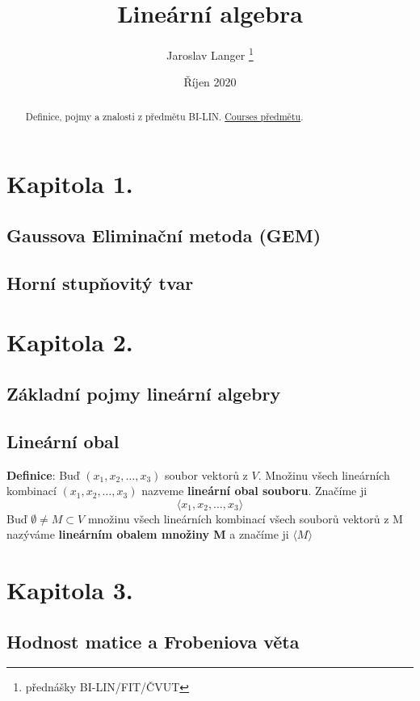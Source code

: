 \documentclass[12pt, letterpaper, twoside]{article}
\title{Lineární algebra}
\author{Jaroslav Langer \thanks{přednášky BI-LIN/FIT/ČVUT}}
\date{Říjen 2020}
\begin{document}
\maketitle

\tableofcontents

\begin{abstract}
Definice, pojmy a znalosti z předmětu BI-LIN. \href{https://courses.fit.cvut.cz/BI-LIN/}{Courses předmětu}.
\end{abstract}

\section{Kapitola 1.}

\subsection*{Gaussova Eliminační metoda (GEM)}

\subsection*{Horní stupňovitý tvar}

\section{Kapitola 2.}
\subsection*{Základní pojmy lineární algebry}

\subsection{Lineární obal}
\textbf{Definice}: Buď $(x_{1},x_{2},\dots, x_{3})$ soubor vektorů z $V$. 
Množinu všech lineárních kombinací $(x_{1},x_{2},\dots, x_{3})$ nazveme \textbf{lineární obal souboru}.
Značíme ji
\[
    \langle x_{1},x_{2},\dots, x_{3} \rangle
\]
Buď $\emptyset \neq M \subset V$ množinu všech lineárních kombinací všech souborů vektorů z M nazýváme
\textbf{lineárním obalem množiny M} a značíme ji $\langle M \rangle$


\section{Kapitola 3.}
\subsection*{Hodnost matice a Frobeniova věta}
\end{document}
